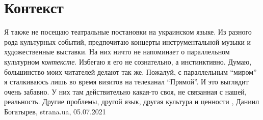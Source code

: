  
 
 
 
 
\chapter{Контекст}

Я также не посещаю театральные постановки на украинском языке. Из разного рода
культурных событий, предпочитаю концерты инструментальной музыки и
художественные выставки. На них ничто не напоминает о параллельном культурном
\emph{контексте}. Избегаю я его не сознательно, а инстинктивно. Думаю, большинство
моих читателей делают так же.  Пожалуй, с параллельным \enquote{миром} я сталкиваюсь
лишь во время визитов на телеканал \enquote{Прямой}. И это выглядит очень забавно. У
них там действительно какая-то своя, не связанная с нашей, реальность. Другие
проблемы, другой язык, другая культура и ценности
, 
Даниил Богатырев, strana.ua, 05.07.2021
